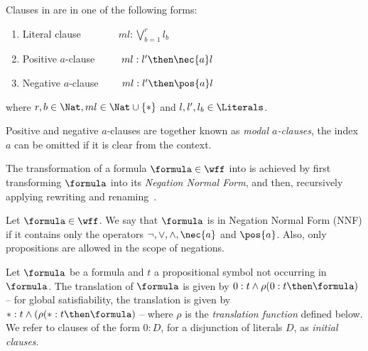 \begin{definition}
    Clauses in  are in one of the following forms:
    \begin{enumerate}
        \item Literal clause $\ \ \quad \qquad ml : \bigvee^r_{b=1} l_b$
        \item Positive $a$-clause $\ \qquad ml : l' \then \nec{a} l$
        \item Negative $a$-clause $\qquad ml : l' \then \pos{a} l$
    \end{enumerate}
    where $r, b \in \Nat, ml \in \Nat \cup \{*\}$ and $l, l', l_b \in
    \Literals$.
\end{definition}

Positive and negative $a$-clauses are together known as \emph{modal
$a$-clauses}, the index $a$ can be omitted if it is clear from the context.

The transformation of a formula $\formula \in \wff$ into  is achieved
by first transforming $\formula$ into its \emph{Negation Normal Form}, and then,
recursively applying rewriting and renaming~\cite{plaisted1986structure}.

\begin{definition}
    Let $\formula \in \wff$. We say that $\formula$ is in Negation Normal Form (NNF) if
    it contains only the operators $\neg, \lor, \land, \nec{a}$ and $\pos{a}$. Also,
    only propositions are allowed in the scope of negations.
\end{definition}

Let $\formula$ be a formula and $t$ a propositional symbol not occurring in
$\formula$. The translation of $\formula$ is given by $0 : t \land \rho(0 : t
\then \formula)$ -- for global satisfiability, the translation is given by $* :
t \land (\rho(* : t \then \formula)$ -- where $\rho$ is the \emph{translation
function} defined below. We refer to clauses of the form $0 : D$, for a
disjunction of literals $D$, as \emph{initial clauses}. 

